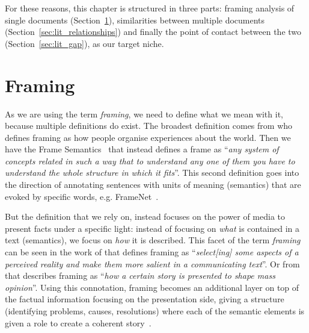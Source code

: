 
For these reasons, this chapter is structured in three parts: framing analysis of single documents (Section~\ref{sec:lit_framing}), similarities between multiple documents (Section~\ref{sec:lit_relationships}) and finally the point of contact between the two (Section~\ref{sec:lit_gap}), as our target niche.


\section{Framing}
\label{sec:lit_framing}

As we are using the term \emph{framing}, we need to define what we mean with it, because multiple definitions do exist.
The broadest definition comes from \citet{goffman1974frame} who defines framing as how people organise experiences about the world.
Then we have the Frame Semantics~\cite{fillmore2006frame} that instead defines a frame as ``\textit{any system of concepts related in such a way that to understand any one of them you have to understand the whole structure in which it fits}''. This second definition goes into the direction of annotating sentences with units of meaning (semantics) that are evoked by specific words, e.g. FrameNet~\cite{baker1998berkeley}.

But the definition that we rely on, instead focuses on the power of media to present facts under a specific light: instead of focusing on \emph{what} is contained in a text (semantics), we focus on \emph{how} it is described.
This facet of the term \emph{framing} can be seen in the work of
\citet{entman1993framing} that defines framing as ``\textit{select[ing] some aspects of a perceived reality and make them more salient in a communicating text}''.
Or from \citet{goffman1974frame} that describes framing as ``\textit{how a certain story is presented to shape mass opinion}''.
Using this connotation, framing becomes an additional layer on top of the factual information focusing on the presentation side, giving a structure (identifying problems, causes, resolutions) where each of the semantic elements is given a role to create a coherent story~\cite{pan1993framing}.



